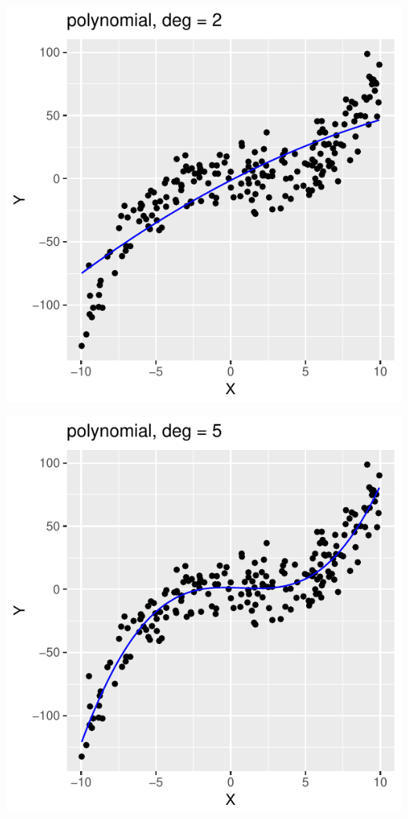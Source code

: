 \begin{frame}
\begin{analysis}


\begin{minipage}[c]{0.24\linewidth}
\includegraphics[width=1.0\linewidth]{../LectureAssets/L04/SimpleRegCV2}
\end{minipage} 
\begin{minipage}[c]{0.24\linewidth}
\includegraphics[width=1.0\linewidth]{../LectureAssets/L04/SimpleRegCV5}

\end{minipage}
\end{analysis}
\end{frame}
